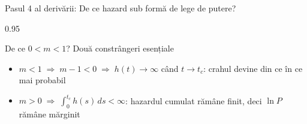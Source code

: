 \documentclass[9pt, aspectratio=169, t]{beamer}
\begin{document}
\begin{frame}{Pasul 4 al derivării: De ce hazard sub formă de lege de putere?}
\begin{cminipage}{0.95\textwidth}
{    \vspace{-2mm}
    \begin{exampleblock}{De ce $0 < m < 1$? Două constrângeri esențiale}
        \begin{itemize}\setlength{\itemsep}{0pt}
            \item $m < 1 \;\Rightarrow\; m{-}1 < 0 \;\Rightarrow\; h(t) \to \infty$ când $t \to t_c$: crahul devine din ce în ce mai probabil
            \item $m > 0 \;\Rightarrow\; \int_0^{t_c}\! h(s)\,ds < \infty$: hazardul cumulat rămâne finit, deci $\ln P$ rămâne mărginit
        \end{itemize}
    \end{exampleblock}
    }
    \end{cminipage}
\end{frame}
\end{document}
